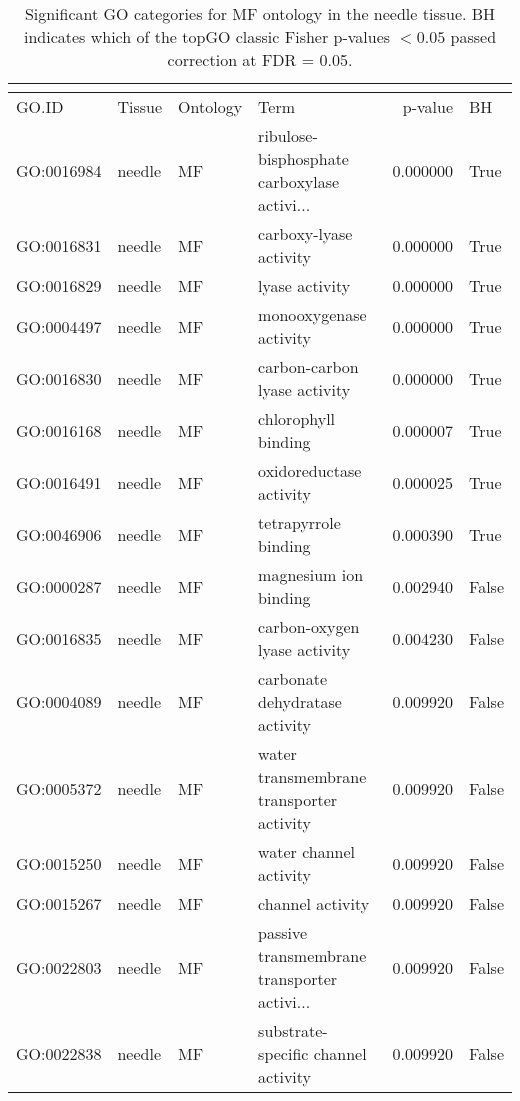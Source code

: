 \begin{longtable}{llllrl}
\caption{Significant GO categories for MF ontology in the needle tissue. BH indicates which of the topGO classic Fisher p-values $< 0.05$ passed correction at FDR = 0.05.}\\
\label{tab:go-needle-MF}\\
\toprule
GO.ID & Tissue & Ontology & Term & p-value & BH \\
\midrule
GO:0016984 & needle & MF &   ribulose-bisphosphate carboxylase activi...  & 0.000000 &    True \\
GO:0016831 & needle & MF &                        carboxy-lyase activity  & 0.000000 &    True \\
GO:0016829 & needle & MF &                                lyase activity  & 0.000000 &    True \\
GO:0004497 & needle & MF &                        monooxygenase activity  & 0.000000 &    True \\
GO:0016830 & needle & MF &                  carbon-carbon lyase activity  & 0.000000 &    True \\
GO:0016168 & needle & MF &                           chlorophyll binding  & 0.000007 &    True \\
GO:0016491 & needle & MF &                       oxidoreductase activity  & 0.000025 &    True \\
GO:0046906 & needle & MF &                          tetrapyrrole binding  & 0.000390 &    True \\
GO:0000287 & needle & MF &                         magnesium ion binding  & 0.002940 &   False \\
GO:0016835 & needle & MF &                  carbon-oxygen lyase activity  & 0.004230 &   False \\
GO:0004089 & needle & MF &                carbonate dehydratase activity  & 0.009920 &   False \\
GO:0005372 & needle & MF &      water transmembrane transporter activity  & 0.009920 &   False \\
GO:0015250 & needle & MF &                        water channel activity  & 0.009920 &   False \\
GO:0015267 & needle & MF &                              channel activity  & 0.009920 &   False \\
GO:0022803 & needle & MF &   passive transmembrane transporter activi...  & 0.009920 &   False \\
GO:0022838 & needle & MF &           substrate-specific channel activity  & 0.009920 &   False \\

\end{longtable}
